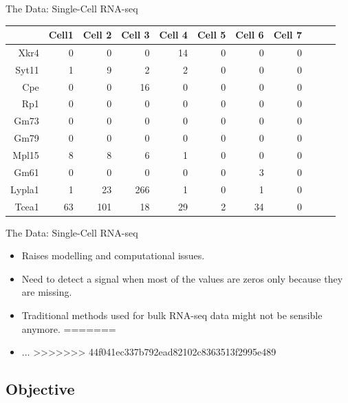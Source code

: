 \documentclass{beamer}
\begin{document}

\begin{frame}{The Data: Single-Cell RNA-seq}

\begin{table}[ht]
\centering
\begin{tabular}{rrrrrrrrrrr}
  \hline
 & Cell1 & Cell 2 & Cell 3 & Cell 4 & Cell 5 & Cell 6 & Cell 7  \\ 
  \hline
Xkr4 & 0 & 0 & 0 & 14 & 0 & 0 & 0  \\ 
  Syt11 & 1 & 9 & 2 & 2 & 0 & 0 & 0  \\ 
  Cpe & 0 & 0 & 16 & 0 & 0 & 0 & 0  \\ 
  Rp1 & 0 & 0 & 0 & 0 & 0 & 0 & 0  \\ 
  Gm73 & 0 & 0 & 0 & 0 & 0 & 0 & 0  \\ 
  Gm79 & 0 & 0 & 0 & 0 & 0 & 0 & 0  \\ 
  Mpl15 & 8 & 8 & 6 & 1 & 0 & 0 & 0  \\ 
  Gm61 & 0 & 0 & 0 & 0 & 0 & 3 & 0 \\ 
  Lypla1 & 1 & 23 & 266 & 1 & 0 & 1 & 0 \\ 
  Tcea1 & 63 & 101 & 18 & 29 & 2 & 34 & 0  \\ 
   \hline
\end{tabular}
\end{table}

\end{frame}

\begin{frame}{The Data: Single-Cell RNA-seq}

\begin{itemize}
<<<<<<< HEAD
  \itemsep10pt
  \item Raises modelling and computational issues.
  \item Need to detect a signal when most of the values are zeros only because they are missing.
  \item Traditional methods used for bulk RNA-seq data might not  be sensible anymore.
=======
  \itemsep12pt
  \item ...
>>>>>>> 44f041ec337b792ead82102c8363513f2995e489
\end{itemize}

\end{frame}

\subsection{Objective}
\end{document}
